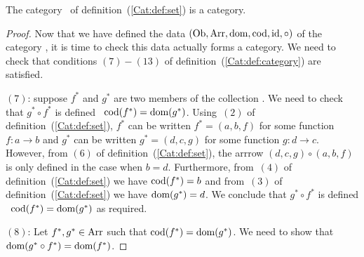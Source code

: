 \begin{lemma}\label{Cat:lemma:set:is:category}
    The category \Set\ of definition~(\ref{Cat:def:set}) is a category.
\end{lemma}
\begin{proof}
    Now that we have defined 
    the data $(\mbox{\rm Ob}, \mbox{\rm Arr}, \mbox{\rm dom}, \mbox{\rm cod}, \mbox{\rm id}, \circ)$ of the category \Set, 
    it is time to check this data actually forms a category. We need to
    check that conditions $(7)-(13)$ of definition~(\ref{Cat:def:category})
    are satisfied. 
    
    $(7)$: suppose $f^{*}$ and $g^{*}$ are two members of 
    the collection \arr. We need to check that $g^{*}\circ f^{*}$ is defined 
    \ifand\ $\mbox{\rm cod}(f^{*})=\mbox{\rm dom}(g^{*})$. Using~$(2)$ of 
    definition~(\ref{Cat:def:set}), $f^{*}$ can be written $f^{*}=(a,b,f)$
    for some function $f:a\to b$ and $g^{*}$ can be written $g^{*}=(d,c,g)$
    for some function $g:d\to c$. However, from $(6)$ of 
    definition~(\ref{Cat:def:set}), the arrrow $(d,c,g)\circ(a,b,f)$ is only 
    defined in the case when $b=d$. Furthermore, from~$(4)$ of 
    definition~(\ref{Cat:def:set}) we have $\mbox{\rm cod}(f^{*})=b$ and from~$(3)$ 
    of definition~(\ref{Cat:def:set}) we have $\mbox{\rm dom}(g^{*})=d$. We conclude
    that $g^{*}\circ f^{*}$ is defined \ifand\ $\mbox{\rm cod}(f^{*})=\mbox{\rm dom}(g^{*})$
    as required.

    $(8)$: Let $f^{*},g^{*}\in\mbox{\rm Arr}$ such that $\mbox{\rm cod}(f^{*})=\mbox{\rm dom}(g^{*})$. 
    We need to show that $\mbox{\rm dom}(g^{*}\circ f^{*})=\mbox{\rm dom}(f^{*})$.
\end{proof}




